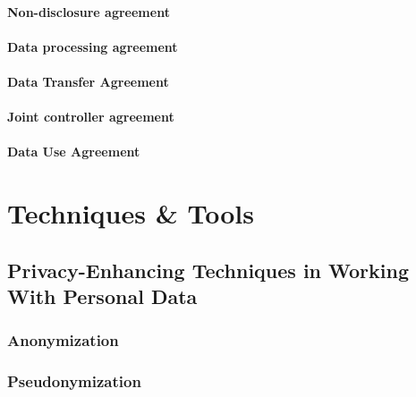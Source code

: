 \documentclass[
]{book}
\begin{document}
\hypertarget{nda}{%
\subsection{Non-disclosure agreement}\label{nda}}

\hypertarget{data-processing-agreement}{%
\subsection{Data processing agreement}\label{data-processing-agreement}}

\hypertarget{data-transfer-agreement}{%
\subsection{Data Transfer Agreement}\label{data-transfer-agreement}}

\hypertarget{joint-controller-agreement}{%
\subsection{Joint controller agreement}\label{joint-controller-agreement}}

\hypertarget{user-agreement}{%
\subsection{Data Use Agreement}\label{user-agreement}}

\hypertarget{part-techniques-tools}{%
\part*{Techniques \& Tools}\label{part-techniques-tools}}

\hypertarget{privacy-enchancing-techniques}{%
\chapter{Privacy-Enhancing Techniques in Working With Personal Data}\label{privacy-enchancing-techniques}}

\hypertarget{anonymization}{%
\section{Anonymization}\label{anonymization}}

\hypertarget{pseudonymization}{%
\section{Pseudonymization}\label{pseudonymization}}
\end{document}
